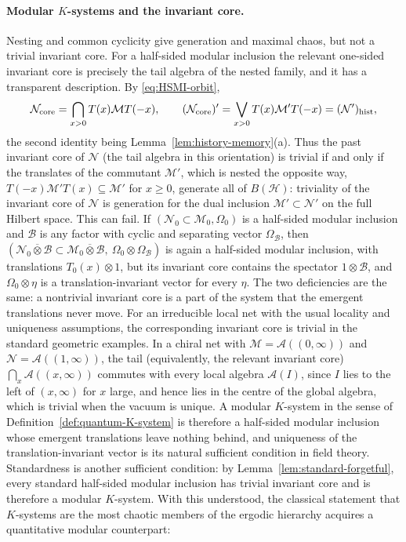 \documentclass[a4paper,11pt]{article}
\theoremstyle{definition}
\newcommand{\mN}{\mathcal{N}}
\newcommand{\mM}{\mathcal{M}}
\begin{document}
\paragraph{Modular $K$-systems and the invariant core.}
Nesting and common cyclicity give generation and maximal chaos, but not a trivial invariant core. For a half-sided modular inclusion the relevant one-sided invariant core is precisely the tail algebra of the nested family, and it has a transparent description. By \eqref{eq:HSMI-orbit},
\begin{equation}
 \mN_{\rm core}=\bigcap_{x>0}T(x)\mM T(-x),
 \qquad
 (\mN_{\rm core})'=\bigvee_{x>0}T(x)\mM'T(-x)=(\mN')_{\rm hist},
 \label{eq:HSMI-tail}
\end{equation}
the second identity being Lemma~\ref{lem:history-memory}(a). Thus the past invariant core of $\mN$ (the tail algebra in this orientation) is trivial if and only if the translates of the commutant $\mM'$, which is nested the opposite way, $T(-x)\mM'T(x)\subseteq\mM'$ for $x\ge0$, generate all of $B(\mathcal H)$: triviality of the invariant core of $\mN$ is generation for the dual inclusion $\mM'\subset\mN'$ on the full Hilbert space. This can fail. If $(\mN_0\subset\mM_0,\Omega_0)$ is a half-sided modular inclusion and $\mathcal B$ is any factor with cyclic and separating vector $\Omega_{\mathcal B}$, then $(\mN_0\overline\otimes\mathcal B\subset\mM_0\overline\otimes\mathcal B,\ \Omega_0\otimes\Omega_{\mathcal B})$ is again a half-sided modular inclusion, with translations $T_0(x)\otimes1$, but its invariant core contains the spectator $1\otimes\mathcal B$, and $\Omega_0\otimes\eta$ is a translation-invariant vector for every $\eta$. The two deficiencies are the same: a nontrivial invariant core is a part of the system that the emergent translations never move. For an irreducible local net with the usual locality and uniqueness assumptions, the corresponding invariant core is trivial in the standard geometric examples. In a chiral net with $\mM=\mathcal A((0,\infty))$ and $\mN=\mathcal A((1,\infty))$, the tail (equivalently, the relevant invariant core) $\bigcap_{x}\mathcal A((x,\infty))$ commutes with every local algebra $\mathcal A(I)$, since $I$ lies to the left of $(x,\infty)$ for $x$ large, and hence lies in the centre of the global algebra, which is trivial when the vacuum is unique. A modular $K$-system in the sense of Definition~\ref{def:quantum-K-system} is therefore a half-sided modular inclusion whose emergent translations leave nothing behind, and uniqueness of the translation-invariant vector is its natural sufficient condition in field theory. Standardness is another sufficient condition: by Lemma~\ref{lem:standard-forgetful}, every standard half-sided modular inclusion has trivial invariant core and is therefore a modular $K$-system. With this understood, the classical statement that $K$-systems are the most chaotic members of the ergodic hierarchy acquires a quantitative modular counterpart:
\end{document}
